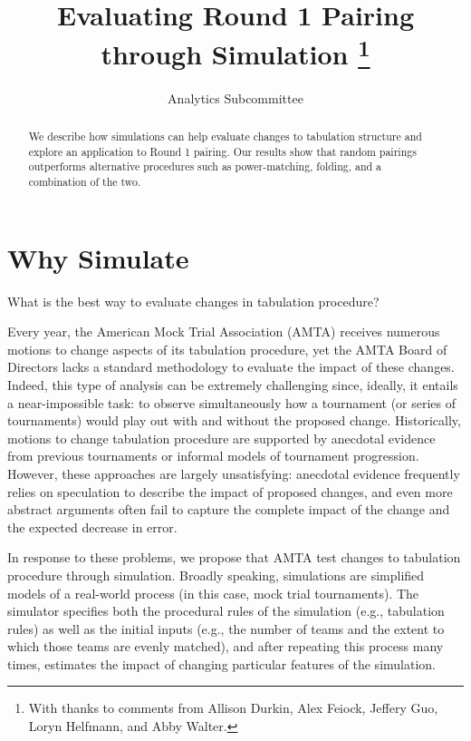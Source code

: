 \documentclass{tufte-handout}
\title{Evaluating Round 1 Pairing through Simulation%
\thanks{With thanks to comments from Allison Durkin, Alex Feiock,  Jeffery Guo, Loryn Helfmann, and Abby Walter.}
}
\author{Analytics Subcommittee}
\begin{document}
\maketitle

\begin{abstract}
\noindent We describe how simulations can help evaluate 
changes to tabulation structure and explore an application to Round 1 pairing. Our results show that random pairings outperforms alternative procedures such as power-matching, folding, and a combination of the two.
\end{abstract}


\section{Why Simulate}
What is the best way to evaluate changes in tabulation procedure?

Every year, the American Mock Trial Association (AMTA) receives numerous motions to change aspects of its tabulation procedure, yet the AMTA Board of Directors lacks a standard methodology to evaluate the impact of these changes. Indeed, this type of analysis can be extremely challenging since, ideally, it entails a near-impossible task: to observe simultaneously how a tournament (or series of tournaments) would play out with and without the proposed change. %
Historically, motions to change tabulation procedure are supported by anecdotal evidence from previous tournaments or informal models of tournament progression. However, these approaches are largely unsatisfying: anecdotal evidence frequently relies on speculation to describe the impact of proposed changes, and even more abstract arguments often fail to capture the complete impact of the change and the expected decrease in error.

In response to these problems, we propose that AMTA test changes to tabulation procedure through simulation. Broadly speaking, simulations are simplified models of a real-world process (in this case, mock trial tournaments). The simulator specifies both the procedural rules of the simulation (e.g., tabulation rules) as well as the initial inputs (e.g., the number of teams and the extent to which those teams are evenly matched), and after repeating this process many times, estimates the impact of changing particular features of the simulation.
\end{document}

